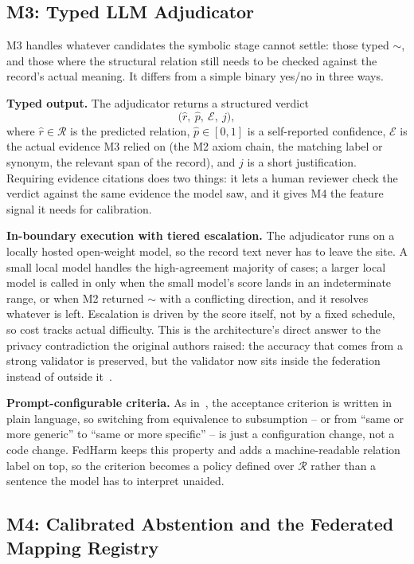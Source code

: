 \documentclass[conference]{IEEEtran}
\begin{document}
\subsection{M3: Typed LLM Adjudicator}

M3 handles whatever candidates the symbolic stage cannot settle: those typed $\sim$, and those where the structural relation still needs to be checked against the record's actual meaning. It differs from a simple binary yes/no in three ways.

\textbf{Typed output.} The adjudicator returns a structured verdict
\begin{equation}
\big(\hat{r},\ \hat{p},\ \mathcal{E},\ j\big),
\end{equation}
where $\hat{r} \in \mathcal{R}$ is the predicted relation, $\hat{p} \in [0,1]$ is a self-reported confidence, $\mathcal{E}$ is the actual evidence M3 relied on (the M2 axiom chain, the matching label or synonym, the relevant span of the record), and $j$ is a short justification. Requiring evidence citations does two things: it lets a human reviewer check the verdict against the same evidence the model saw, and it gives M4 the feature signal it needs for calibration.

\textbf{In-boundary execution with tiered escalation.} The adjudicator runs on a locally hosted open-weight model, so the record text never has to leave the site. A small local model handles the high-agreement majority of cases; a larger local model is called in only when the small model's score lands in an indeterminate range, or when M2 returned $\sim$ with a conflicting direction, and it resolves whatever is left. Escalation is driven by the score itself, not by a fixed schedule, so cost tracks actual difficulty. This is the architecture's direct answer to the privacy contradiction the original authors raised: the accuracy that comes from a strong validator is preserved, but the validator now sits inside the federation instead of outside it~\cite{b1,b25}.

\textbf{Prompt-configurable criteria.} As in~\cite{b1}, the acceptance criterion is written in plain language, so switching from equivalence to subsumption -- or from ``same or more generic'' to ``same or more specific'' -- is just a configuration change, not a code change. FedHarm keeps this property and adds a machine-readable relation label on top, so the criterion becomes a policy defined over $\mathcal{R}$ rather than a sentence the model has to interpret unaided.

\subsection{M4: Calibrated Abstention and the Federated Mapping Registry}
\end{document}

